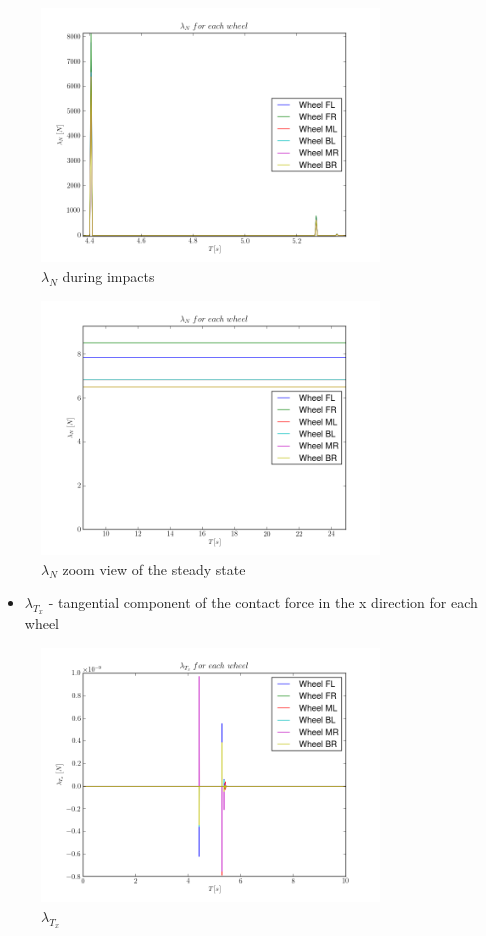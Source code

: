 \begin{figure}[H]
  \centering
    \includegraphics[width=0.8\textwidth]{lambdaN}
  \caption{$\lambda_{N}$ during impacts}
\end{figure}

\begin{figure}[H]
  \centering
    \includegraphics[width=0.8\textwidth]{lambdaNzoom}
  \caption{$\lambda_{N}$ zoom view of the steady state}
\end{figure}

\begin{itemize}
  \item $\lambda_{T_x}$ - tangential component of the contact force in the x direction for each wheel
\end{itemize}

\begin{figure}[H]
  \centering
    \includegraphics[width=0.8\textwidth]{lambdaTx}
  \caption{$\lambda_{T_x}$}
\end{figure}

